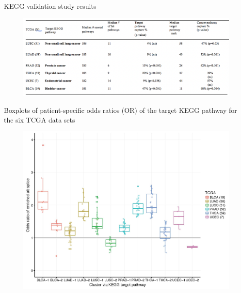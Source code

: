\documentclass[ignorenonframetext,aspectratio=169,]{beamer}
\begin{document}
\begin{frame}{%
\protect\hypertarget{kegg-validation-study-results}{%
KEGG validation study results}}

\begin{figure}[htb]
  \centering \includegraphics[keepaspectratio,width=\textwidth,height=0.8\textheight]{../n1pas/figures/table2.png}
\end{figure}

\end{frame}

\begin{frame}{%
\protect\hypertarget{boxplots-of-patient-specific-odds-ratios-or-of-the-target-kegg-pathway-for-the-six-tcga-data-sets}{%
Boxplots of patient-specific odds ratios (OR) of the target KEGG pathway
for the six TCGA data sets}}

\begin{figure}[htb]
  \centering \includegraphics[keepaspectratio,width=\textwidth,height=0.8\textheight]{../n1pas/figures/Figure3.jpg}
\end{figure}

\end{frame}
\end{document}
